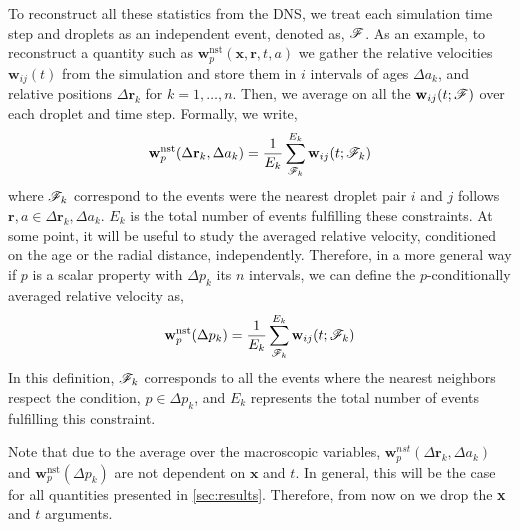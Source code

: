 To reconstruct all these statistics from the DNS, we treat each simulation time step and droplets as an independent event, denoted as, $\mathscr{F}$. 
As an example, to reconstruct a quantity such as $\textbf{w}^\text{nst}_p(\textbf{x},\textbf{r},t,a)$ we gather the relative velocities $\textbf{w}_{ij}(t)$ from the simulation and store them in $i$ intervals of ages $\Delta a_k$, and relative positions $\Delta \textbf{r}_k$ for $k = 1,\ldots, n$.
Then, we average on all the $\textbf{w}_{ij}(t;\mathscr{F})$ over each droplet and time step.
Formally, we write, 
\begin{equation}
    \textbf{w}^\text{nst}_p(\Delta\textbf{r}_k,\Delta a_k)
    = \frac{1}{E_k} 
    \sum^{E_k}_{\FF_k} 
    \textbf{w}_{ij}(t;\FF_k)
    \label{eq:vec_cond}
\end{equation}
where $\mathscr{F}_k$ correspond to the events were the nearest droplet pair $i$ and $j$ follows $\textbf{r},a \in \Delta \textbf{r}_k ,\Delta a_k$.
$E_k$ is the total number of events fulfilling these constraints. 
At some point, it will be useful to study the averaged relative velocity, conditioned on the age or the radial distance, independently. 
Therefore, in a more general way if $p$ is a scalar property with $\Delta p_k$ its $n$ intervals, we can define the $p$-conditionally averaged relative velocity as, 
\begin{equation}
    \textbf{w}^\text{nst}_p(\Delta p_k)
    = \frac{1}{E_{k}} 
    \sum^{E_{k}}_{\FF_{k}}  
    \textbf{w}_{ij}(t;\FF_k)
    \label{eq:scalar_cond}
\end{equation}
In this definition, $\mathscr{F}_{k}$ corresponds to all the events where the nearest neighbors respect the condition, $p \in \Delta p_k$, and $E_{k}$ represents the total number of events fulfilling this constraint. 

Note that due to the average over the macroscopic variables, $\textbf{w}_p^{nst}(\Delta\textbf{r}_k,\Delta a_k)$ and $\textbf{w}^\text{nst}_p(\Delta p_k)$ are not dependent on $\textbf{x}$ and $t$. 
In general, this will be the case for all quantities presented in \ref{sec:results}. 
Therefore, from now on we drop the \textbf{x} and $t$ arguments. 


